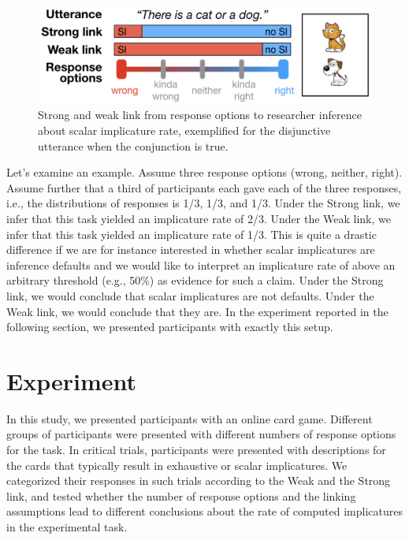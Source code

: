 \documentclass[floatsintext,man]{apa6}
\theoremstyle{definition}
\theoremstyle{definition}
\theoremstyle{definition}
\theoremstyle{remark}
\begin{document}
\begin{figure}
\centering
\includegraphics{writeup_files/figure-latex/linkvisualization-1.pdf}
\caption{\label{fig:linkvisualization}Strong and weak link from response
options to researcher inference about scalar implicature rate,
exemplified for the disjunctive utterance when the conjunction is true.}
\end{figure}

Let's examine an example. Assume three response options (wrong, neither,
right). Assume further that a third of participants each gave each of
the three responses, i.e., the distributions of responses is 1/3, 1/3,
and 1/3. Under the Strong link, we infer that this task yielded an
implicature rate of 2/3. Under the Weak link, we infer that this task
yielded an implicature rate of 1/3. This is quite a drastic difference
if we are for instance interested in whether scalar implicatures are
inference defaults and we would like to interpret an implicature rate of
above an arbitrary threshold (e.g., 50\%) as evidence for such a claim.
Under the Strong link, we would conclude that scalar implicatures are
not defaults. Under the Weak link, we would conclude that they are. In
the experiment reported in the following section, we presented
participants with exactly this setup.

\section{Experiment}\label{experiment}

In this study, we presented participants with an online card game.
Different groups of participants were presented with different numbers
of response options for the task. In critical trials, participants were
presented with descriptions for the cards that typically result in
exhaustive or scalar implicatures. We categorized their responses in
such trials according to the Weak and the Strong link, and tested
whether the number of response options and the linking assumptions lead
to different conclusions about the rate of computed implicatures in the
experimental task.
\end{document}
